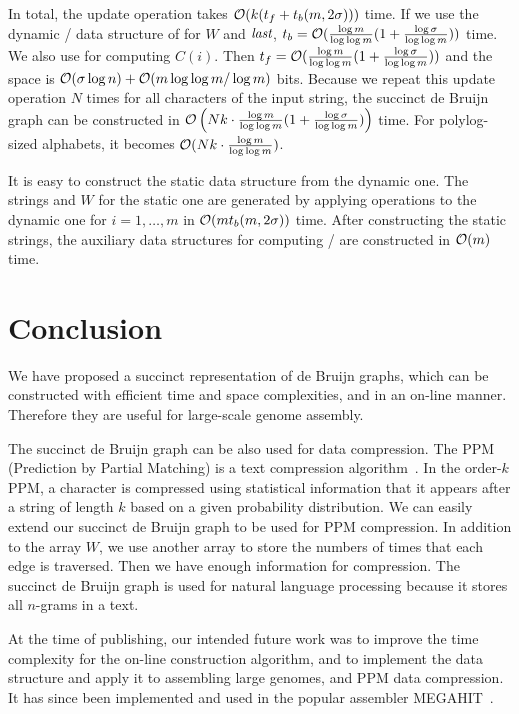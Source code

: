 In total, the update operation takes 
$\mathcal{O}(k(t_f + t_b(m,2\sigma)))$ time.
If we use the dynamic {\rank}/{\select} data structure of \cite{NavSad10}
for $W$ and ${\textit{last}}$, $t_b = \mathcal{O}(\frac{\log m}{\log \log m}(1+\frac{\log\sigma}{\log\log m}))$ time.
We also use \cite{NavSad10} for computing $C(i)$.  Then $t_f = \mathcal{O}(\frac{\log m }{\log \log m}(1+\frac{\log\sigma}{\log\log m}))$
and the space is $\mathcal{O}(\sigma \log n) + \mathcal{O}(m \log \log m/\log m)$ bits.
Because we repeat this update operation $N$ times for all characters of the input string,
the succinct de Bruijn graph can be constructed in
$\mathcal{O}\left(Nk \cdot \frac{\log m}{\log \log m}
(1+\frac{\log\sigma}{\log\log m})\right)$ time.
For polylog-sized alphabets, it becomes $\mathcal{O}(Nk \cdot \frac{\log m}{\log \log m})$.

It is easy to construct the static data structure from the dynamic one.
The strings {\last} and $W$ for the static one are generated by
applying {\access} operations to the dynamic one for $i=1,\ldots,m$
in $\mathcal{O}(m t_b(m,2\sigma))$ time.
After constructing the static strings, the auxiliary data structures for
computing {\rank}/{\select} are constructed in $\mathcal{O}(m)$ time.


\section{Conclusion}\label{p1-sec:conclusion}
We have proposed a succinct representation of de Bruijn graphs,
which can be constructed with efficient time and space complexities,
and in an on-line manner.
Therefore they are useful for large-scale genome assembly.

The succinct de Bruijn graph can be also used for data compression.
The PPM (Prediction by Partial Matching) is a text compression algorithm~\cite{CleWit84}.
In the order-$k$ PPM, a character is compressed using statistical information
that it appears after a string of length $k$ based on a given probability distribution.
We can easily extend our succinct de Bruijn graph to be used for PPM compression.
In addition to the array $W$, we use another array to store the numbers of times
that each edge is traversed.  Then we have enough information for compression.
The succinct de Bruijn graph is used for natural language processing because
it stores all $n$-grams in a text.

At the time of publishing, our intended future work was to improve the time complexity for
the on-line construction algorithm, and to implement the data structure and apply it to
assembling large genomes, and PPM data compression. It has since been implemented and used
in the popular assembler MEGAHIT~\cite{megahit}.

